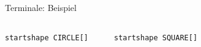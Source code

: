 \documentclass{beamer}
\theoremstyle{example}
\begin{document}
\begin{frame}{Terminale: Beispiel}
  \begin{columns}
    \column{3cm}
    \lstinline!startshape CIRCLE[]!
    \begin{center}
    \end{center}
    \column{3cm}
    \lstinline!startshape SQUARE[]!
    \begin{center}
    \end{center}
    \column{3cm}

\end{columns}
\end{frame}
\end{document}

